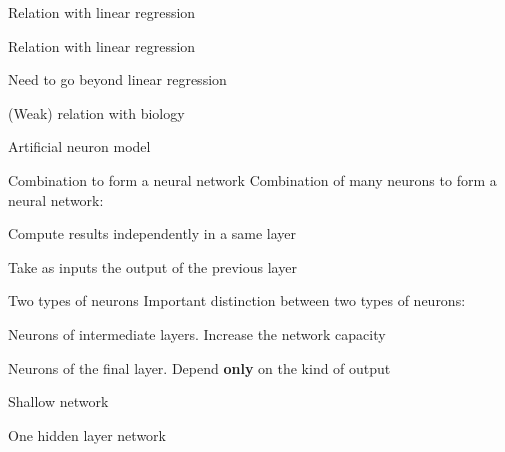 \begin{frame}{Relation with linear regression}
\end{frame}

\begin{frame}{Relation with linear regression}
\end{frame}

\begin{frame}{Need to go beyond linear regression}
\end{frame}

\begin{frame}{(Weak) relation with biology}
\end{frame}

\begin{frame}{Artificial neuron model}
\end{frame}

\begin{frame}{Combination to form a neural network}
  Combination of many neurons to form a neural network:
  \begin{description}[<+(1)->]
    \item[In parallel] Compute results independently in a same layer
    \item[In series] Take as inputs the output of the previous layer
  \end{description}
\end{frame}

\begin{frame}{Two types of neurons}
  Important distinction between two types of neurons:
  \begin{description}[<+(1)->]
    \item[Hidden neurons] Neurons of intermediate layers. Increase the network capacity
    \item[Output neurons] Neurons of the final layer. Depend \textbf{only} on the kind of output
  \end{description}
\end{frame}

\begin{frame}{Shallow network}
  \centering
\end{frame}

\begin{frame}{One hidden layer network}
  \centering
\end{frame}

